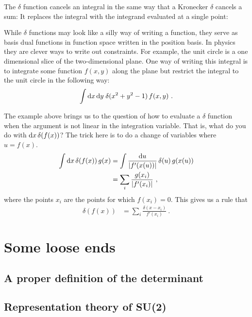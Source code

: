 \documentclass[12pt, oneside]{report}    %
\let\oldsection\section
\def\section{%
  \setcounter{sidenote}{1}%
  \oldsection
}
\begin{document}
\begin{subappendices}
The $\delta$ function cancels an integral in the same way that a Kronecker $\delta$ cancels a sum: It replaces the integral with the integrand evaluated at a single point:

While $\delta$ functions may look like a silly way of writing a function, they serve as basis dual functions in function space written in the position basis. In physics they are clever ways to write out constraints. For example, the unit circle is a one dimensional slice of the two-dimensional plane. One way of writing this integral is to integrate some function $f(x,y)$ along the plane but restrict the integral to the unit circle in the following way:
\begin{align}
    \int \operatorname{d}\!{x}\operatorname{d}\!{y}\; \delta(x^2 + y^2 - 1) \, f(x,y) \ .
\end{align}

The example above brings us to the question of how to evaluate a $\delta$ function when the argument is not linear in the integration variable. That is, what do you do with $\operatorname{d}\!{x}\, \delta(f(x))$? The trick here is to do a change of variables where $u = f(x)$.
\begin{align}
    \int \operatorname{d}\!{x}\, \delta(f(x))\, g(x)
    &= 
    \int \frac{\operatorname{d}\!{u}}{|f'(x(u))|} \, \delta(u) \, g(x(u))
    \\
    &= \sum_i\frac{g(x_i)}{|f'(x_i)|} \ ,
\end{align}
where the points $x_i$ are the points for which $f(x_i) = 0$. This gives us a rule that
\begin{align}
    \delta(f(x)) &= \sum_i \frac{\delta(x-x_i)}{f'(x_i)} \ .
\end{align}






\end{subappendices}


\chapter{Some loose ends}


\section{A proper definition of the determinant}
\section{Representation theory of SU(2)}
\end{document}
